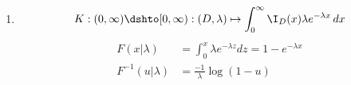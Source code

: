 \begin{enumerate}
\begin{gradedsolution}
\begin{enumerate}
      The error function is defined as
      \begin{equation*}
        \textrm{erf}(x) := \frac{2}{\sqrt{\pi}}\int_0^x e^{-z^2}dz,
      \end{equation*}
      and so
      \begin{align*}
        F(x| t_1, t_2)      & =\frac{1}{2}+ \frac{1}{2}\text{erf}\left(\frac{x-t_1}{\sqrt{2}t_2}\right) \\
        F^{-1}(u | t_1, t_2) & =\sqrt{2}t_2 \text{erf}^{-1}(2u-1)+t_1.
      \end{align*}
      
      Alternatively, if $\Phi$ denotes the CDF of the standard Gaussian distribution, we have
      \begin{align*}
        F(x| t_1, t_2)      & = \Phi\left(\frac{x-t_1}{t_2}\right) \\
        F^{-1}(u | t_1, t_2) & = t_1 + t_2 \Phi^{-1}(u).
      \end{align*}

      \item {}
      $$K : (0,\infty) \dshto [0,\infty) : (D,\lambda) \mapsto \int_0^\infty \I_D(x) \lambda e^{-\lambda x} \,dx$$
      \begin{align*}
        F(x|\lambda)      & =\int_0^x \lambda e^{-\lambda z} dz = 1-e^{-\lambda x} \\
        F^{-1}(u|\lambda) & =\frac{-1}{\lambda}\log(1-u)
      \end{align*}
    \end{enumerate}
  \end{gradedsolution}

\end{enumerate}



